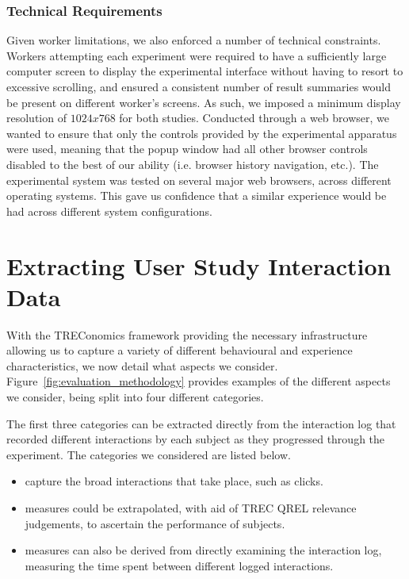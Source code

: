 \subsubsection{Technical Requirements}
Given worker limitations, we also enforced a number of technical constraints. Workers attempting each experiment were required to have a sufficiently large computer screen to display the experimental interface without having to resort to excessive scrolling, and ensured a consistent number of result summaries would be present on different worker's screens. As such, we imposed a minimum display resolution of $1024x768$ for both studies. Conducted through a web browser, we wanted to ensure that only the controls provided by the experimental apparatus were used, meaning that the popup window had all other browser controls disabled to the best of our ability (i.e. browser history navigation, etc.). The experimental system was tested on several major web browsers, across different operating systems. This gave us confidence that a similar experience would be had across different system configurations.

\section{Extracting User Study Interaction Data}\label{sec:csm:methodology:extracting}
With the TREConomics framework providing the necessary infrastructure allowing us to capture a variety of different behavioural and experience characteristics, we now detail what aspects we consider. Figure~\ref{fig:evaluation_methodology} provides examples of the different aspects we consider, being split into four different categories.

The first three categories can be extracted directly from the interaction log that recorded different interactions by each subject as they progressed through the experiment. The categories we considered are listed below.

\begin{itemize}
    
    \item[]{ capture the broad interactions that take place, such as clicks.}
    \item[]{ measures could be extrapolated, with aid of TREC QREL relevance judgements, to ascertain the performance of subjects.}
    \item[]{ measures can also be derived from directly examining the interaction log, measuring the time spent between different logged interactions.}
    
\end{itemize}

